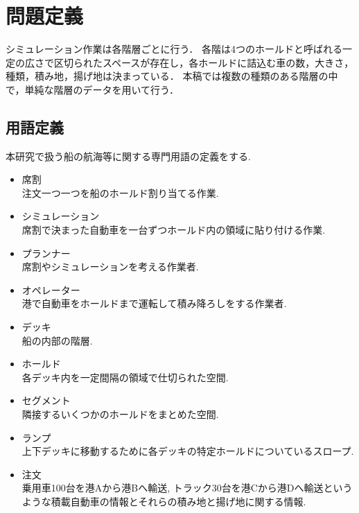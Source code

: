 \chapter{問題定義}\label{definition}

シミュレーション作業は各階層ごとに行う．
各階は4つのホールドと呼ばれる一定の広さで区切られたスペースが存在し，各ホールドに詰込む車の数，大きさ，種類，積み地，揚げ地は決まっている．
本稿では複数の種類のある階層の中で，単純な階層のデータを用いて行う．



\section{用語定義}
本研究で扱う船の航海等に関する専門用語の定義をする.

\begin{itemize}
    \item 席割 \\
    注文一つ一つを船のホールド割り当てる作業.

    \item シミュレーション \\
    席割で決まった自動車を一台ずつホールド内の領域に貼り付ける作業.

    \item  プランナー \\
    席割やシミュレーションを考える作業者.

    \item  オペレーター\\
    港で自動車をホールドまで運転して積み降ろしをする作業者.

    \item デッキ \\
    船の内部の階層.

    \item ホールド \\
    各デッキ内を一定間隔の領域で仕切られた空間.

    \item セグメント \\
    隣接するいくつかのホールドをまとめた空間.

    \item ランプ \\
    上下デッキに移動するために各デッキの特定ホールドについているスロープ.

    \item 注文 \\
    乗用車100台を港Aから港Bへ輸送, トラック30台を港Cから港Dへ輸送というような積載自動車の情報とそれらの積み地と揚げ地に関する情報. 


\end{itemize}
